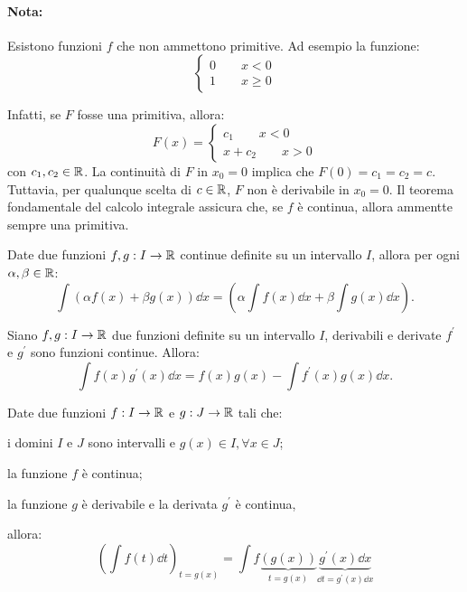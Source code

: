 \paragraph{Nota:} Esistono funzioni $f$ che non ammettono primitive. Ad esempio la funzione:
\[\begin{cases}
0 \qquad x<0 \\
1 \qquad x \geq 0
\end{cases}\]

Infatti, se $F$ fosse una primitiva, allora:
\[F(x)=\begin{cases}
c_1 \qquad x<0 \\
x+c_2 \qquad x>0
\end{cases}\]
con $c_1,c_2\in\mathbb{R}$. La continuità di $F$ in $x_0=0$ implica che $F(0)=c_1=c_2=c$.
Tuttavia, per qualunque scelta di $c\in\mathbb{R}$, $F$ non è derivabile in $x_0=0$.
Il teorema fondamentale del calcolo integrale assicura che, se $f$ è continua, allora ammentte sempre una primitiva.

\begin{teo}[Linearità.]
Date due funzioni $f,g:I\rightarrow\mathbb{R}$ continue definite su un intervallo $I$, allora per ogni $\alpha,\beta\in\mathbb{R}$:
\[\int(\alpha f(x)+\beta g(x))\dd x=(\alpha\int f(x)\dd x+\beta \int g(x)\dd x).\]
\end{teo}

\begin{teo}
Siano $f,g:I\rightarrow\mathbb{R}$ due funzioni definite su un intervallo $I$, derivabili e derivate $f^\prime$ e $g^\prime$ sono funzioni continue. Allora:
\[\int f(x)g^\prime(x)\dd x=f(x)g(x)-\int f^\prime(x)g(x)\dd x.\]
\end{teo}

\begin{teo}
Date due funzioni $f:I\rightarrow\mathbb{R}$ e $g:J\rightarrow\mathbb{R}$ tali che:
\begin{aenumerate}
\item i domini $I$ e $J$ sono intervalli e $g(x)\in I, \forall x \in J$;
\item la funzione $f$ è continua;
\item la funzione $g$ è derivabile e la derivata $g^\prime$ è continua,
\end{aenumerate}
allora:
\[\left(\int f(t) \dd t \right)_{t=g(x)}=\int f\underbrace{(g(x))}_{t=g(x)} \underbrace{g^\prime(x)\dd x}_{\dd t = g^\prime(x)\dd x}\]
\end{teo}

